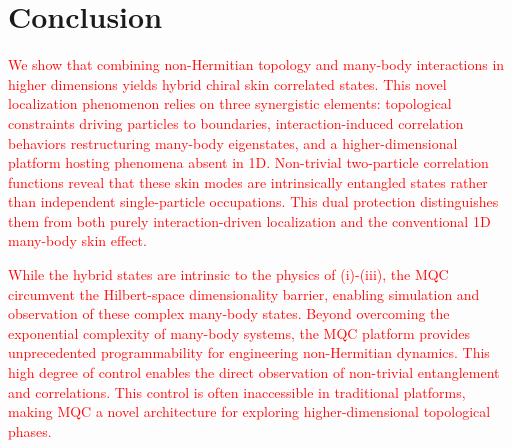 \documentclass[longbibliography, aps, prx, amsmath, amssymb, amsfonts, twocolumn,superscriptaddress, footinbib]{revtex4-1}
\begin{document}
	\section{Conclusion}

	\textcolor{red}{
	We show that combining non-Hermitian topology and many-body interactions in higher dimensions yields hybrid chiral skin correlated states. This novel localization phenomenon relies on three synergistic elements: topological constraints driving particles to boundaries, interaction-induced correlation behaviors restructuring many-body eigenstates, and a higher-dimensional platform hosting phenomena absent in 1D. Non-trivial two-particle correlation functions reveal that these skin modes are intrinsically entangled states rather than independent single-particle occupations. This dual protection distinguishes them from both purely interaction-driven localization and the conventional 1D many-body skin effect.
	}

	\textcolor{red}{
	While the hybrid states are intrinsic to the physics of (i)-(iii), the MQC circumvent the Hilbert-space dimensionality barrier, enabling simulation and observation of these complex many-body states. 
	Beyond overcoming the exponential complexity of many-body systems, the MQC platform provides unprecedented programmability for engineering non-Hermitian dynamics. This high degree of control enables the direct observation of non-trivial entanglement and correlations. This control is often inaccessible in traditional platforms, making MQC a novel architecture for exploring higher-dimensional topological phases.
	}
\end{document}
